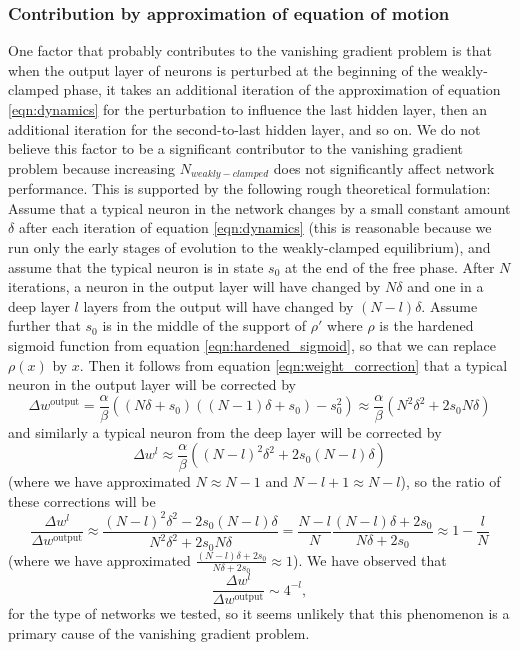 \documentclass{article}
\newcommand{\npar}{\\\indent}
\begin{document}
\subsubsection{Contribution by approximation of equation of motion}

One factor that probably contributes to the vanishing gradient problem is that when the output layer of neurons is perturbed at the beginning of the weakly-clamped phase, it takes an additional iteration of the approximation of equation \ref{eqn:dynamics} for the perturbation to influence the last hidden layer, then an additional iteration for the second-to-last hidden layer, and so on. We do not believe this factor to be a significant contributor to the vanishing gradient problem because increasing $N_{weakly-clamped}$ does not significantly affect network performance. This is supported by the following rough theoretical formulation:
\npar
Assume that a typical neuron in the network changes by a small constant amount $\delta$ after each iteration of equation \ref{eqn:dynamics} (this is reasonable because we run only the early stages of evolution to the weakly-clamped equilibrium), and assume that the typical neuron is in state $s_0$ at the end of the free phase. After $N$ iterations, a neuron in the output layer will have changed by $N\delta$ and one in a deep layer $l$ layers from the output will have changed by $(N-l)\delta$. Assume further that $s_0$ is in the middle of the support of $\rho'$ where $\rho$ is the hardened sigmoid function from equation \ref{eqn:hardened_sigmoid}, so that we can replace $\rho(x)$ by $x$. Then it follows from equation \ref{eqn:weight_correction} that a typical neuron in the output layer will be corrected by 
\begin{equation}
\Delta w^\text{output}=\frac{\alpha}{\beta}((N\delta + s_0)((N-1)\delta + s_0)-s_0^2)\approx \frac{\alpha}{\beta}(N^2\delta^2+2s_0N\delta)
\end{equation}
and similarly a typical neuron from the deep layer will be corrected by 
\begin{equation}
\Delta w^l\approx \frac{\alpha}{\beta}((N-l)^2\delta^2+2s_0(N-l)\delta)
\end{equation}
(where we have approximated $N\approx N-1$ and $N-l+1\approx N-l$), so the ratio of these corrections will be
\begin{equation}
\frac{\Delta w^l}{\Delta w^{\text{output}}}\approx \frac{(N-l)^2\delta^2-2s_0(N-l)\delta}{N^2\delta^2+2s_0N\delta}=\frac{N-l}{N}\frac{(N-l)\delta+2s_0}{N\delta+2s_0}\approx 1-\frac{l}{N}
\end{equation}
(where we have approximated $\frac{(N-l)\delta +2s_0}{N\delta+2s_0}\approx 1$). We have observed that
\begin{equation}
\frac{\Delta w^l}{\Delta w^{\text{output}}}\sim 4^{-l},
\end{equation}
for the type of networks we tested, so it seems unlikely that this phenomenon is a primary cause of the vanishing gradient problem.
\end{document}
